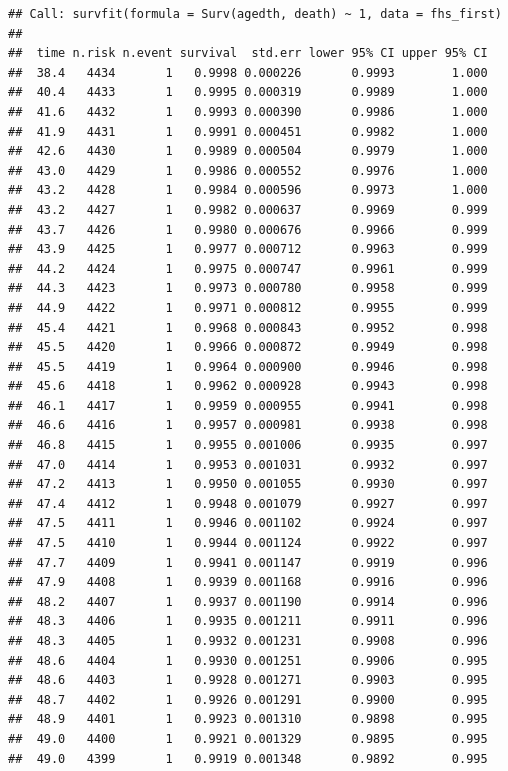 \documentclass[
]{book}
\begin{document}
\begin{verbatim}
## Call: survfit(formula = Surv(agedth, death) ~ 1, data = fhs_first)
## 
##  time n.risk n.event survival  std.err lower 95% CI upper 95% CI
##  38.4   4434       1   0.9998 0.000226       0.9993        1.000
##  40.4   4433       1   0.9995 0.000319       0.9989        1.000
##  41.6   4432       1   0.9993 0.000390       0.9986        1.000
##  41.9   4431       1   0.9991 0.000451       0.9982        1.000
##  42.6   4430       1   0.9989 0.000504       0.9979        1.000
##  43.0   4429       1   0.9986 0.000552       0.9976        1.000
##  43.2   4428       1   0.9984 0.000596       0.9973        1.000
##  43.2   4427       1   0.9982 0.000637       0.9969        0.999
##  43.7   4426       1   0.9980 0.000676       0.9966        0.999
##  43.9   4425       1   0.9977 0.000712       0.9963        0.999
##  44.2   4424       1   0.9975 0.000747       0.9961        0.999
##  44.3   4423       1   0.9973 0.000780       0.9958        0.999
##  44.9   4422       1   0.9971 0.000812       0.9955        0.999
##  45.4   4421       1   0.9968 0.000843       0.9952        0.998
##  45.5   4420       1   0.9966 0.000872       0.9949        0.998
##  45.5   4419       1   0.9964 0.000900       0.9946        0.998
##  45.6   4418       1   0.9962 0.000928       0.9943        0.998
##  46.1   4417       1   0.9959 0.000955       0.9941        0.998
##  46.6   4416       1   0.9957 0.000981       0.9938        0.998
##  46.8   4415       1   0.9955 0.001006       0.9935        0.997
##  47.0   4414       1   0.9953 0.001031       0.9932        0.997
##  47.2   4413       1   0.9950 0.001055       0.9930        0.997
##  47.4   4412       1   0.9948 0.001079       0.9927        0.997
##  47.5   4411       1   0.9946 0.001102       0.9924        0.997
##  47.5   4410       1   0.9944 0.001124       0.9922        0.997
##  47.7   4409       1   0.9941 0.001147       0.9919        0.996
##  47.9   4408       1   0.9939 0.001168       0.9916        0.996
##  48.2   4407       1   0.9937 0.001190       0.9914        0.996
##  48.3   4406       1   0.9935 0.001211       0.9911        0.996
##  48.3   4405       1   0.9932 0.001231       0.9908        0.996
##  48.6   4404       1   0.9930 0.001251       0.9906        0.995
##  48.6   4403       1   0.9928 0.001271       0.9903        0.995
##  48.7   4402       1   0.9926 0.001291       0.9900        0.995
##  48.9   4401       1   0.9923 0.001310       0.9898        0.995
##  49.0   4400       1   0.9921 0.001329       0.9895        0.995
##  49.0   4399       1   0.9919 0.001348       0.9892        0.995

\end{verbatim}
\end{document}
